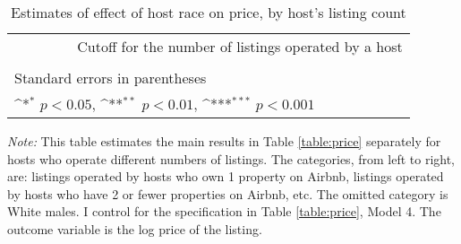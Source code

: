 \begin{table}[htbp]\centering
	\def\sym#1{\ifmmode^{#1}\else\(^{#1}\)\fi}
	\caption{Estimates of effect of host race on price, by host's listing count}
	\begin{tabular}{l*{6}{c}}
		\hline\hline
		&\multicolumn{6}{c}{Cutoff for the number of listings operated by a host} \\
		\cmidrule(r){2-7}\\
		
		\hline\hline
		\multicolumn{5}{l}{\footnotesize Standard errors in parentheses}\\
		\multicolumn{5}{l}{\footnotesize \sym{*} \(p<0.05\), \sym{**} \(p<0.01\), \sym{***} \(p<0.001\)}\\
	\end{tabular}
	\label{table:robustness_listings_count}
	\begin{tablenotes}

		\item {\it Note:} This table estimates the main results in Table \ref{table:price} separately for hosts who operate different numbers of listings. The categories, from left to right, are: listings operated by hosts who own 1 property on Airbnb, listings operated by hosts who have 2 or fewer properties on Airbnb, etc. The omitted category is White males. I control for the specification in Table \ref{table:price}, Model 4. The outcome variable is the log price of the listing.
		
	\end{tablenotes}
\end{table}




